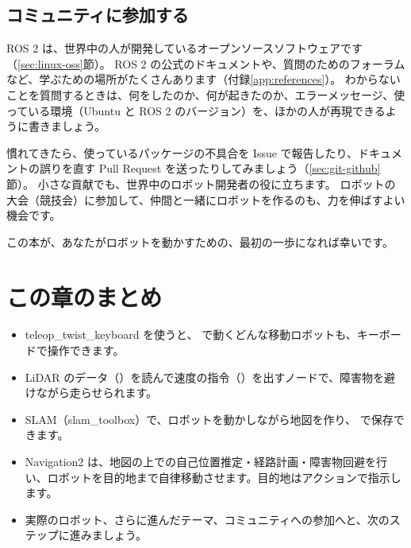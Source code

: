 \subsection{コミュニティに参加する}

ROS 2 は、世界中の人が開発しているオープンソースソフトウェアです（\ref{sec:linux-oss}節）。
ROS 2 の公式のドキュメントや、質問のためのフォーラムなど、学ぶための場所がたくさんあります（付録\ref{app:references}）。
わからないことを質問するときは、何をしたのか、何が起きたのか、エラーメッセージ、使っている環境（Ubuntu と ROS 2 のバージョン）を、ほかの人が再現できるように書きましょう。

慣れてきたら、使っているパッケージの不具合を Issue で報告したり、ドキュメントの誤りを直す Pull Request を送ったりしてみましょう（\ref{sec:git-github}節）。
小さな貢献でも、世界中のロボット開発者の役に立ちます。
ロボットの大会（競技会）に参加して、仲間と一緒にロボットを作るのも、力を伸ばすよい機会です。

この本が、あなたがロボットを動かすための、最初の一歩になれば幸いです。

\section*{この章のまとめ}

\begin{itemize}
  \item teleop\_twist\_keyboard を使うと、 で動くどんな移動ロボットも、キーボードで操作できます。
  \item LiDAR のデータ（）を読んで速度の指令（）を出すノードで、障害物を避けながら走らせられます。
  \item SLAM（slam\_toolbox）で、ロボットを動かしながら地図を作り、 で保存できます。
  \item Navigation2 は、地図の上での自己位置推定・経路計画・障害物回避を行い、ロボットを目的地まで自律移動させます。目的地はアクションで指示します。
  \item 実際のロボット、さらに進んだテーマ、コミュニティへの参加へと、次のステップに進みましょう。
\end{itemize}
